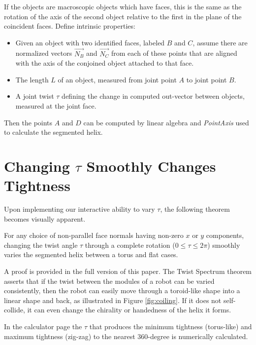 \documentclass{svproc}
\begin{document}
If the objects are macroscopic objects which have faces, this is the same as the rotation
of the axis of the second object relative to the first in the plane of the coincident faces.
Define intrinsic properties:

\begin{itemize}
\item Given an object with two identified faces, labeled $B$ and $C$, assume there are normalized
  vectors $\overrightarrow{N_B}$ and $\overrightarrow{N_C}$
  from each of these points that are aligned with the axis of the conjoined object attached to
  that face.
\item The length $L$ of an object, measured from joint point $A$ to joint point $B$.
\item A joint twist $\tau$ defining the change in computed out-vector between objects,
  measured at the joint face.
\end{itemize}
Then the points $A$ and $D$ can be computed by linear algebra and {\em PointAxis} used to calculate the
segmented helix.

\section{Changing $\tau$ Smoothly Changes Tightness}

Upon implementing our interactive ability to vary $\tau$, the following
theorem becomes visually apparent.

\begin{theorem}
  For any choice of non-parallel face normals having non-zero $x$ or $y$ components,
  changing the twist angle $\tau$ through a complete rotation ($0 \leq \tau \leq 2\pi$)
  smoothly varies the segmented helix
  between a torus and flat cases.
\end{theorem}

A proof is provided in the full version of this paper\cite{readfullsegmentedhelix}.
The Twist Spectrum theorem asserts that if the twist between the modules of a robot
can be varied consistently, then the robot can easily move through a toroid-like shape
into a linear shape and back, as illustrated in Figure \ref{fig:coiling}. If it does not self-collide, it can even change the chirality
or handedness of the helix it forms.

In the calculator page
the $\tau$ that produces the minimum tightness (torus-like) and maximum tightness (zig-zag) to the
nearest 360-degree is numerically calculated.
\end{document}
